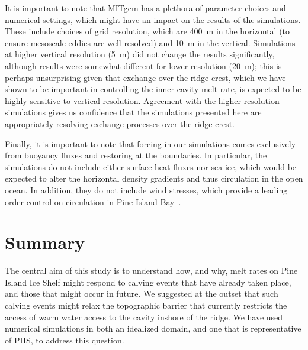 \documentclass[draft]{agujournal2019}
\begin{document}
It is important to note that MITgcm has a plethora of parameter choices and numerical settings, which might have an impact on the results of the simulations. These include choices of grid resolution, which are 400~m in the horizontal (to ensure mesoscale eddies are well resolved) and 10~m in the vertical. Simulations at higher vertical resolution (5~m) did not change the results significantly, although results were somewhat different for lower resolution (20~m); this is perhaps unsurprising given that exchange over the ridge crest, which we have shown to be important in controlling the inner cavity melt rate, is expected to be highly sensitive to vertical resolution. Agreement with the higher resolution simulations gives us confidence that the simulations presented here are appropriately resolving exchange processes over the ridge crest. 


Finally, it is important to note that forcing in our simulations comes exclusively from buoyancy fluxes and restoring at the boundaries. In particular, the simulations do not include either surface heat fluxes nor sea ice, which would be expected to alter the horizontal density gradients and thus circulation in the open ocean. In addition, they do not include wind stresses, which provide a leading order control on circulation in Pine Island Bay~\cite{Dutrieux2014Science}.

\section{Summary}\label{S:Summary}
The central aim of this study is to understand how, and why, melt rates on Pine Island Ice Shelf might respond to calving events that have already taken place, and those that might occur in future. We suggested at the outset that such calving events might relax the topographic barrier that currently restricts the access of warm water access to the cavity inshore of the ridge. We have used numerical simulations in both an idealized domain, and one that is representative of PIIS, to address this question.
\end{document}
